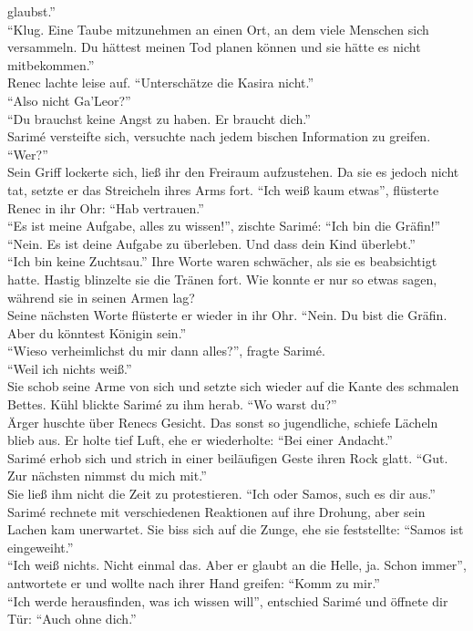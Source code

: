 glaubst.''\\
``Klug. Eine Taube mitzunehmen an einen Ort, an dem viele Menschen sich versammeln. Du hättest 
meinen Tod planen können und sie hätte es nicht mitbekommen.''\\
Renec lachte leise auf. ``Unterschätze die Kasira nicht.''\\
``Also nicht Ga'Leor?''\\
``Du brauchst keine Angst zu haben. Er braucht dich.''\\
Sarimé versteifte sich, versuchte nach jedem bischen Information zu greifen. ``Wer?''\\
Sein Griff lockerte sich, ließ ihr den Freiraum aufzustehen. Da sie es jedoch nicht tat, setzte er 
das Streicheln ihres Arms fort. ``Ich weiß kaum etwas'', flüsterte Renec in ihr Ohr: ``Hab 
vertrauen.''\\
``Es ist meine Aufgabe, alles zu wissen!'', zischte Sarimé: ``Ich bin die Gräfin!''\\
``Nein. Es ist deine Aufgabe zu überleben. Und dass dein Kind überlebt.''\\
``Ich bin keine Zuchtsau.'' Ihre Worte waren schwächer, als sie es beabsichtigt hatte. Hastig 
blinzelte sie die Tränen fort. Wie konnte er nur so etwas sagen, während sie in seinen Armen lag?\\
Seine nächsten Worte flüsterte er wieder in ihr Ohr. ``Nein. Du bist die Gräfin. Aber du könntest 
Königin sein.''\\
``Wieso verheimlichst du mir dann alles?'', fragte Sarimé.\\
``Weil ich nichts weiß.''\\
Sie schob seine Arme von sich und setzte sich wieder auf die Kante des schmalen Bettes. Kühl 
blickte Sarimé zu ihm herab. ``Wo warst du?''\\
Ärger huschte über Renecs  Gesicht. Das sonst so jugendliche, schiefe Lächeln blieb aus. Er holte 
tief Luft, ehe er wiederholte: ``Bei einer Andacht.''\\
Sarimé erhob sich und strich in einer beiläufigen Geste ihren Rock glatt. ``Gut. Zur nächsten 
nimmst du mich mit.''\\
Sie ließ ihm nicht die Zeit zu protestieren. ``Ich oder Samos, such es dir aus.''\\
Sarimé rechnete mit verschiedenen Reaktionen auf ihre Drohung, aber sein Lachen kam unerwartet. Sie biss sich auf die Zunge, ehe sie feststellte: ``Samos ist eingeweiht.''\\
``Ich weiß nichts. Nicht einmal das. Aber er glaubt an die Helle, ja. Schon immer'', antwortete er und wollte nach ihrer Hand greifen: ``Komm zu mir.''\\
``Ich werde herausfinden, was ich wissen will'', entschied Sarimé und öffnete dir Tür: ``Auch ohne dich.''\\








